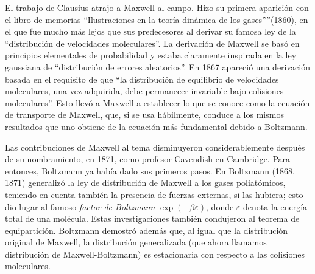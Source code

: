 \par
El trabajo de Clausius atrajo a Maxwell al campo. Hizo su primera aparición con el libro de memorias \enquote{Ilustraciones en la teoría dinámica de los gases”}(1860), en el que fue mucho más lejos que sus predecesores al derivar su famosa ley de la \enquote{distribución de velocidades moleculares}. La derivación de Maxwell se basó en principios elementales de probabilidad y estaba claramente inspirada en la ley gaussiana de \enquote{distribución de errores aleatorios}. En 1867 apareció una derivación basada en el requisito de que \enquote{la distribución de equilibrio de velocidades moleculares, una vez adquirida, debe permanecer invariable bajo colisiones moleculares}. Esto llevó a Maxwell a establecer lo que se conoce como la ecuación de transporte de Maxwell, que, si se usa hábilmente, conduce a los mismos resultados que uno obtiene de la ecuación más fundamental debido a Boltzmann.
\par
Las contribuciones de Maxwell al tema disminuyeron considerablemente después de su nombramiento, en 1871, como profesor Cavendish en Cambridge. Para entonces, Boltzmann ya había dado sus primeros pasos. En Boltzmann (1868, 1871) generalizó la ley de distribución de Maxwell a los gases poliatómicos, teniendo en cuenta también la presencia de fuerzas externas, si las hubiera; esto dio lugar al famoso \emph{factor de Boltzmann} $\exp(- \beta \varepsilon)$, donde $\varepsilon$ denota la energía total de una molécula. Estas investigaciones también condujeron al teorema de equipartición. Boltzmann demostró además que, al igual que la distribución original de Maxwell, la distribución generalizada (que ahora llamamos distribución de Maxwell-Boltzmann) es estacionaria con respecto a las colisiones moleculares.
\par
